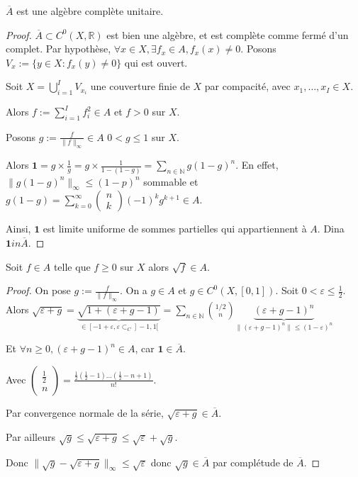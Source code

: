 \begin{lemme}
$\overline{A}$ est une algèbre complète unitaire.
\end{lemme}
\begin{proof}
	$\overline{A} \subset C^0\left(X,\mathbb{R}\right)$ est bien une algèbre, et est complète comme fermé d'un complet. 
	Par hypothèse, $\forall x\in X, \exists f_x \in A, f_x\left( x \right) \neq 0 $.
	Posons $V_x := \{y \in X : f_x\left( y \right) \neq 0\} $ qui est ouvert.

	Soit $X = \bigcup_{i=1} ^I V_{x_i}$ une couverture finie de $X$ par compacité, avec $x_1,\ldots,x_I \in X$.

	Alors $f:= \sum_{i=1}^{I} f_i^2 \in A$ et $f>0$ sur $X$.

	Posons $g:= \frac{f}{\|f\|_\infty} \in A$ $0 < g\le 1$ sur $X$.

	Alors $ \mathbf{1} = g \times \frac{1}{g} = g \times \frac{1}{1-(1-g)}  = \sum_{n\in \mathbb{N}}g(1-g)^n$.
En effet, $\|g\left( 1-g \right) ^n\|_{\infty}\le (1-p)^n$ sommable et $g\left( 1-g \right) = \sum_{k=0}^{\infty} \begin{pmatrix} n \\ k \end{pmatrix} (-1)^k g^{k+1} \in A$.

Ainsi, $\mathbf{1} $ est limite uniforme de sommes partielles qui appartiennent à $A$. Dina $\mathbf{1} in \overline{A}$.

\end{proof}

\begin{lemme}
	Soit $ f \in A$ telle que $f\ge 0$ sur $X$ alors $\sqrt{f} \in A$.
\end{lemme}
\begin{proof}
	On pose $g := \frac{f}{\|f\|_\infty}$. On a $g \in A$ et $g \in C^0\left(X,[0,1]\right)  $.
	Soit $0< \varepsilon\le \frac{1}{2}$. Alors $\sqrt{\varepsilon+g} = \underbrace{\sqrt{1 + \left( \varepsilon + g -1 \right) } }_{\in [-1 + \varepsilon, \varepsilon \subset_C  ]-1,1[ }=\sum_{n\in \mathbb{N}} \binom{1/2}{n} \underbrace{ \left( \varepsilon + g -1 \right) ^n}_{\|(\varepsilon+g-1)^n\|\le (1-\varepsilon)^n}$
 
 Et $ \forall n\ge 0, \left( \varepsilon+g-1 \right)^n \in A  $, car $\mathbf{1} \in \overline{A}$.

Avec $\begin{pmatrix} \frac{1}{2}\\ n \end{pmatrix} = \frac{\frac{1}{2} (\frac{1}{2} -1) \ldots (\frac{1}{2} - n+1)}{n!}$.

Par convergence normale de la série, $\sqrt{\varepsilon+g} \in \overline{A}$.

Par ailleurs $\sqrt{g} \le \sqrt{\varepsilon+g}  \le \sqrt{\varepsilon} + \sqrt{g} $.

Donc $\|\sqrt{g} - \sqrt{\varepsilon+g} \|_\infty \le \sqrt{\varepsilon} $ donc $\sqrt{g} \in \overline{A}$ par complétude de $\overline{A}$.
\end{proof}

